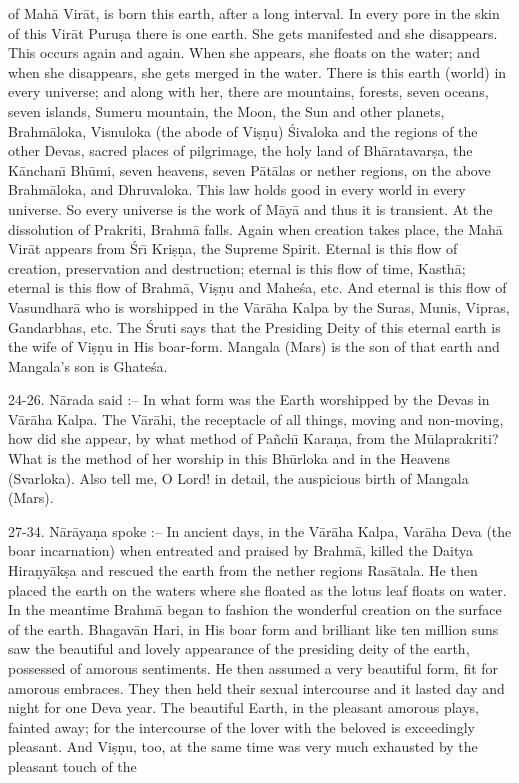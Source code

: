 of Mah\=a Vir\=at, is born this earth, after a long interval. In every pore in the skin of this Vir\=at Puru\d{s}a there is one earth. She gets manifested and she disappears. This occurs again and again. When she appears, she floats on the water; and when she disappears, she gets merged in the water. There is this earth (world) in every universe; and along with her, there are mountains, forests, seven oceans, seven islands, Sumeru mountain, the Moon, the Sun and other planets, Brahm\=aloka, Visnuloka (the abode of Vi\d{s}\d{n}u) \'Sivaloka and the regions of the other Devas, sacred places of pilgrimage, the holy land of Bh\=aratavar\d{s}a, the K\=anchan\={\i} Bh\=umi, seven heavens, seven P\=at\=alas or nether regions, on the above Brahm\=aloka, and Dhruvaloka. This law holds good in every world in every universe. So every universe is the work of M\=ay\=a and thus it is transient. At the dissolution of Prakriti, Brahm\=a falls. Again when creation takes place, the Mah\=a Vir\=at appears from \'Sr\={\i} Kri\d{s}\d{n}a, the Supreme Spirit. Eternal is this flow of creation, preservation and destruction; eternal is this flow of time, Kasth\=a; eternal is this flow of Brahm\=a, Vi\d{s}\d{n}u and Mahe\'sa, etc. And eternal is this flow of Vasundhar\=a who is worshipped in the V\=ar\=aha Kalpa by the Suras, Munis, Vipras, Gandarbhas, etc. The \'Sruti says that the Presiding Deity of this eternal earth is the wife of Vi\d{s}\d{n}u in His boar-form. Mangala (Mars) is the son of that earth and Mangala's son is Ghate\'sa.

24-26. N\=arada said :-- In what form was the Earth worshipped by the Devas in V\=ar\=aha Kalpa. The V\=ar\=ahi, the receptacle of all things, moving and non-moving, how did she appear, by what method of Pa\~nch\={\i} Kara\d{n}a, from the M\=ulaprakriti? What is the method of her worship in this Bh\=urloka and in the Heavens (Svarloka). Also tell me, O Lord! in detail, the auspicious birth of Mangala (Mars).

27-34. N\=ar\=aya\d{n}a spoke :-- In ancient days, in the V\=ar\=aha Kalpa, Var\=aha Deva (the boar incarnation) when entreated and praised by Brahm\=a, killed the Daitya Hira\d{n}y\=ak\d{s}a and rescued the earth from the nether regions Ras\=atala. He then placed the earth on the waters where she floated as the lotus leaf floats on water. In the meantime Brahm\=a began to fashion the wonderful creation on the surface of the earth. Bhagav\=an Hari, in His boar form and brilliant like ten million suns saw the beautiful and lovely appearance of the presiding deity of the earth, possessed of amorous sentiments. He then assumed a very beautiful form, fit for amorous embraces. They then held their sexual intercourse and it lasted day and night for one Deva year. The beautiful Earth, in the pleasant amorous plays, fainted away; for the intercourse of the lover with the beloved is exceedingly pleasant. And Vi\d{s}\d{n}u, too, at the same time was very much exhausted by the pleasant touch of the

